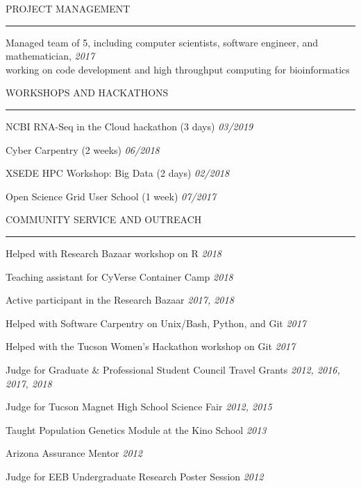 \documentclass{resume} %
\renewenvironment{rSection}[1]{
\sectionskip
\textcolor{RoyalPurple}{\MakeUppercase{#1}}
\sectionlineskip
\hrule
\begin{list}{}{
\setlength{\leftmargin}{1.5em}
}
\item[]
}{
\end{list}
}
\begin{document}

\begin{rSection}{Project Management}

\item Managed team of 5, including computer scientists, software engineer, and mathematician, \hfill {\em 2017}\\ 
working on code development and high throughput computing for bioinformatics

\end{rSection}


\begin{rSection}{Workshops and Hackathons}

\item NCBI RNA-Seq in the Cloud hackathon (3 days) \hfill {\em 03/2019}
\item Cyber Carpentry (2 weeks) \hfill {\em 06/2018}
\item XSEDE HPC Workshop: Big Data (2 days) \hfill {\em 02/2018}
\item Open Science Grid User School (1 week) \hfill {\em 07/2017}

\end{rSection}


\begin{rSection}{Community Service and Outreach}

\item Helped with Research Bazaar workshop on R \hfill {\em 2018}
\item Teaching assistant for CyVerse Container Camp \hfill {\em 2018}
\item Active participant in the Research Bazaar \hfill {\em 2017, 2018}
\item Helped with Software Carpentry on Unix/Bash, Python, and Git \hfill {\em 2017}
\item Helped with the Tucson Women’s Hackathon workshop on Git \hfill {\em 2017}
\item Judge for Graduate \& Professional Student Council Travel Grants \hfill {\em 2012, 2016, 2017, 2018}
\item Judge for Tucson Magnet High School Science Fair \hfill {\em 2012, 2015}
\item Taught Population Genetics Module at the Kino School \hfill {\em 2013}
\item Arizona Assurance Mentor \hfill {\em 2012}
\item Judge for EEB Undergraduate Research Poster Session \hfill {\em 2012}

\end{rSection}
\end{document}
